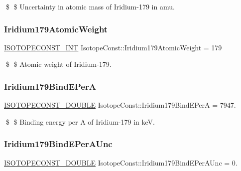 \$ \$ Uncertainty in atomic mass of Iridium-\/179 in amu. \mbox{\label{group___isotope_const-_iridium-_ir179_ga8fc5f6ea5d3211f86c96b0c0abb24a04}} 
\subsubsection{\texorpdfstring{Iridium179\+Atomic\+Weight}{Iridium179AtomicWeight}}
{\footnotesize\ttfamily \mbox{\hyperlink{group___isotope_const-_macros_ga5f18360b3e99483a35c32d789e62621c}{I\+S\+O\+T\+O\+P\+E\+C\+O\+N\+S\+T\+\_\+\+I\+NT}} Isotope\+Const\+::\+Iridium179\+Atomic\+Weight = 179}

\$ \$ Atomic weight of Iridium-\/179. \mbox{\label{group___isotope_const-_iridium-_ir179_ga2764e579ad9f3f8db2f2c1b28f7f9397}} 
\subsubsection{\texorpdfstring{Iridium179\+Bind\+E\+PerA}{Iridium179BindEPerA}}
{\footnotesize\ttfamily \mbox{\hyperlink{group___isotope_const-_macros_ga8f45a7272ce02c0b4c65c44636ed719a}{I\+S\+O\+T\+O\+P\+E\+C\+O\+N\+S\+T\+\_\+\+D\+O\+U\+B\+LE}} Isotope\+Const\+::\+Iridium179\+Bind\+E\+PerA = 7947.}

\$ \$ Binding energy per A of Iridium-\/179 in keV. \mbox{\label{group___isotope_const-_iridium-_ir179_ga1182317165711249d81f3bd2cf6e37a7}} 
\subsubsection{\texorpdfstring{Iridium179\+Bind\+E\+Per\+A\+Unc}{Iridium179BindEPerAUnc}}
{\footnotesize\ttfamily \mbox{\hyperlink{group___isotope_const-_macros_ga8f45a7272ce02c0b4c65c44636ed719a}{I\+S\+O\+T\+O\+P\+E\+C\+O\+N\+S\+T\+\_\+\+D\+O\+U\+B\+LE}} Isotope\+Const\+::\+Iridium179\+Bind\+E\+Per\+A\+Unc = 0.}

